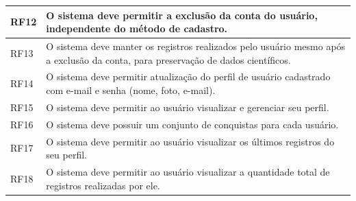 \begin{longtable}{@{}p{1.5cm}p{13cm}@{}}
    RF12 & O sistema deve permitir a exclusão da conta do usuário, independente do método de cadastro. \\ \hline
    RF13 & O sistema deve manter os registros realizados pelo usuário mesmo após a exclusão da conta, 
    para preservação de dados científicos. \\ \hline

    RF14 & O sistema deve permitir atualização do perfil de usuário cadastrado com e-mail e senha (nome, foto, e-mail). \\ \hline
    
    RF15 & O sistema deve permitir ao usuário visualizar e gerenciar seu perfil. \\ \hline
    RF16 & O sistema deve possuir um conjunto de conquistas para cada usuário. \\ \hline
    RF17 & O sistema deve permitir ao usuário visualizar os últimos registros do seu perfil. \\ \hline
    RF18 & O sistema deve permitir ao usuário visualizar a quantidade total de registros realizadas por ele. \\ \hline


\end{longtable}
